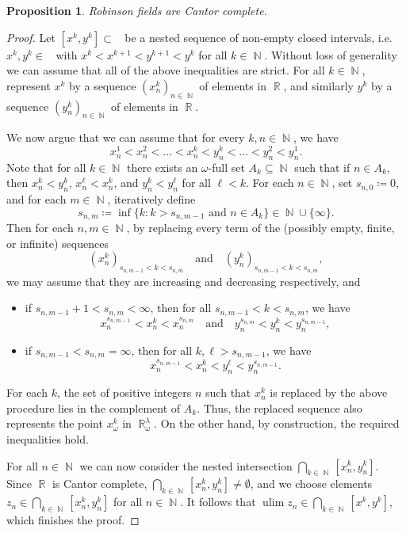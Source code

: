 \documentclass{amsart}
\theoremstyle{plain}
\newtheorem{proposition}{Proposition}[section]
\theoremstyle{definition}
\DeclareMathOperator{\ulim}{ulim}
\DeclareMathOperator{\Nb}{{\mathbb{N}}}
\DeclareMathOperator{\Rb}{{\mathbb{R}}}
\DeclareMathOperator{\Rbom}{\mathbb{R}^\lambda_\omega}
\newcommand{\1}{\mathbf{1}}
\begin{document}
\begin{proposition}
    Robinson fields are Cantor complete.
\end{proposition}
\begin{proof}
    Let $[x^k,y^k] \subset \Rbom$ be a nested sequence of non-empty closed intervals, i.e.\ $x^k, y^k \in \Rbom$ with $x^k < x^{k+1} < y^{k+1} < y^k$ for all $k \in \Nb$.
    Without loss of generality we can assume that all of the above inequalities are strict.
    For all $k \in \Nb$, represent $x^k$ by a sequence $(x_n^k)_{n \in \Nb}$ of elements in $\Rb$, and similarly $y^k$ by a sequence $(y_n^k)_{n \in \Nb}$ of elements in $\Rb$.
    

    We now argue that we can assume that for every $k,n\in\Nb$, we have
    \[x_n^1<x_n^2<\dots<x_n^k<y_n^k<\dots<y_n^2<y_n^1.\]
   Note that for all $k \in \Nb$ there exists an $\omega$-full set $A_k \subseteq \Nb$ such that if $n\in A_k$, then $x_n^k <y_n^k$, $x_n^\ell<x_n^k$, and $y_n^k<y_n^\ell$ for all $\ell<k$. For each $n\in\Nb$, set $s_{n,0}\coloneqq0$, and for each $m\in\Nb$, iteratively define 
   \[s_{n,m}\coloneqq\inf\{k:k> s_{n,m-1}\text{ and }n\in A_k\}\in\Nb\cup\{\infty\}.\]
   Then for each $n,m\in\Nb$, by replacing every term of the (possibly empty, finite, or infinite) sequences 
   \[(x_n^k)_{s_{n,m-1}<k<s_{n,m}}\quad\text{and}\quad(y_n^k)_{s_{n,m-1}<k<s_{n,m}},\] 
   we may assume that they are increasing and decreasing respectively, and
   \begin{itemize}
       \item if $s_{n,m-1}+1<s_{n,m}<\infty$, then for all $s_{n,m-1}<k<s_{n,m}$, we have
       \[x_n^{s_{n,m-1}}<x_n^k<x_n^{s_{n,m}}\quad\text{and}\quad y_n^{s_{n,m}}<y_n^k<y_n^{s_{n,m-1}},\]
       \item if $s_{n,m-1}<s_{n,m}=\infty$, then for all $k,\ell>s_{n,m-1}$, we have
       \[x_n^{s_{n,m-1}}<x_n^k<y_n^\ell<y_n^{s_{n,m-1}}.\]
   \end{itemize}
   For each $k$, the set of positive integers $n$ such that $x_n^k$ is replaced by the above procedure lies in the complement of $A_k$. Thus, the replaced sequence also represents the point $x_\omega^k$ in $\Rb^\lambda_\omega$. On the other hand, by construction, the required inequalities hold.

    
    For all $n \in \Nb$ we can now consider the nested intersection 
    $\bigcap_{k \in \Nb} [x_n^k,y_n^k]$.
    Since $\Rb$ is Cantor complete, $\bigcap_{k \in \Nb} [x_n^k,y_n^k] \neq \emptyset$, and we choose elements $z_n \in \bigcap_{k \in \Nb} [x_n^k,y_n^k]$ for all $n \in \Nb$.
    It follows that $\ulim z_n \in \bigcap_{k\in \Nb}[x^k, y^k]$, which finishes the proof.
\end{proof}
\end{document}
